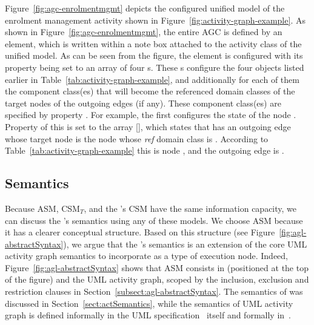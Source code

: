 {Figure~\ref{fig:agc-enrolmentmgmt} depicts the configured unified model of the enrolment management activity shown in  Figure~\ref{fig:activity-graph-example}. As shown in Figure~\ref{fig:agc-enrolmentmgmt}, the entire AGC is defined by an  element, which is written within a note box attached to the activity class  of the unified model.
%
As can be seen from the figure, the  element is configured with its property  being set to an array of four s. These s configure the four  objects listed earlier in Table~\ref{tab:activity-graph-example}, and additionally for each of them the component class(es) that will become the referenced domain classes of the target nodes of the outgoing edges (if any). These component class(es) are specified by property . For example, the first  configures the state of the node . Property  of this  is set to the array [], which states that  has an outgoing edge whose target node is the node whose \textit{ref} domain class is . According to Table~\ref{tab:activity-graph-example} this is node , and the outgoing edge is .

\subsection*{Semantics} \label{sect:agl-semantics}

Because ASM, CSM$_T$, and the \agl's CSM have the same information capacity, we can discuss the \agl's semantics using any of these models. We choose ASM because it has a clearer conceptual structure. Based on this structure (see Figure~\ref{fig:agl-abstractSyntax}), we argue that the \agl's semantics is an extension of the core UML activity graph semantics to incorporate  as a type of execution node. Indeed, Figure~\ref{fig:agl-abstractSyntax} shows that ASM consists in  (positioned at the top of the figure) and the UML activity graph, scoped by the inclusion, exclusion and restriction clauses in Section~\ref{subsect:agl-abstractSyntax}. The semantics of  was discussed in Section~\ref{sect:actSemantics}, while the semantics of UML activity graph is defined informally in the UML specification~\cite{omg_unified_2017} itself and formally in~\cite{daw_extensible_2015}.

}
